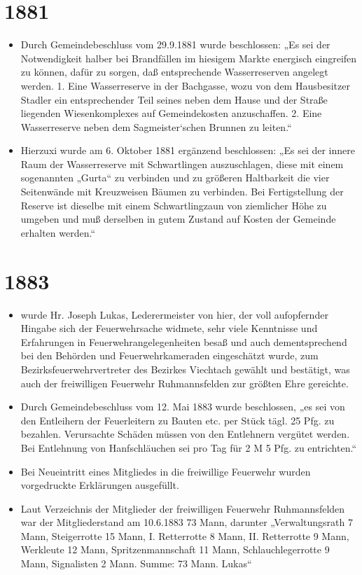 \documentclass[12pt,a4paper]{book}
\begin{document}
\section*{1881}

\begin{itemize}
\item Durch Gemeindebeschluss vom 29.9.1881 wurde beschlossen: „Es sei
der Notwendigkeit halber bei Brandfällen im hiesigem Markte energisch
eingreifen zu können, dafür zu sorgen, daß entsprechende Wasserreserven
angelegt werden. 1. Eine Wasserreserve in der Bachgasse, wozu von dem
Hausbesitzer Stadler ein entsprechender Teil seines neben dem Hause und
der Straße liegenden Wiesenkomplexes auf Gemeindekosten anzuschaffen. 2.
Eine Wasserreserve neben dem Sagmeister`schen Brunnen zu leiten.“

\item Hierzuxi wurde am 6. Oktober 1881 ergänzend beschlossen: „Es sei
der innere Raum der Wasserreserve mit Schwartlingen auszuschlagen, diese
mit einem sogenannten „Gurta“ zu verbinden und zu größeren Haltbarkeit
die vier Seitenwände mit Kreuzweisen Bäumen zu verbinden. Bei
Fertigstellung der Reserve ist dieselbe mit einem Schwartlingzaun von
ziemlicher Höhe zu umgeben und muß derselben in gutem Zustand auf Kosten
der Gemeinde erhalten werden.“
\end{itemize}

\section*{1883}

\begin{itemize}
\item wurde Hr. Joseph Lukas, Lederermeister von hier, der voll
aufopfernder Hingabe sich der Feuerwehrsache widmete, sehr viele
Kenntnisse und Erfahrungen in Feuerwehrangelegenheiten besaß und auch
dementsprechend bei den Behörden und Feuerwehrkameraden eingeschätzt
wurde, zum Bezirksfeuerwehrvertreter des Bezirkes Viechtach gewählt und
bestätigt, was auch der freiwilligen Feuerwehr Ruhmannsfelden zur
größten Ehre gereichte.

\item Durch Gemeindebeschluss vom 12. Mai 1883 wurde beschlossen, „es
sei von den Entleihern der Feuerleitern zu Bauten etc. per Stück tägl.
25 Pfg. zu bezahlen. Verursachte Schäden müssen von den Entlehnern
vergütet werden. Bei Entlehnung von Hanfschläuchen sei pro Tag für 2 M 5
Pfg. zu entrichten.“

\item Bei Neueintritt eines Mitgliedes in die freiwillige Feuerwehr
wurden vorgedruckte Erklärungen ausgefüllt.

\item Laut Verzeichnis der Mitglieder der freiwilligen Feuerwehr
Ruhmannsfelden war der Mitgliederstand am 10.6.1883 73 Mann, darunter
„Verwaltungsrath 7 Mann, Steigerrotte 15 Mann, I. Retterrotte 8 Mann,
II. Retterrotte 9 Mann, Werkleute 12 Mann, Spritzenmannschaft 11 Mann,
Schlauchlegerrotte 9 Mann, Signalisten 2 Mann. Summe: 73 Mann. Lukas“
\end{itemize}
\end{document}

